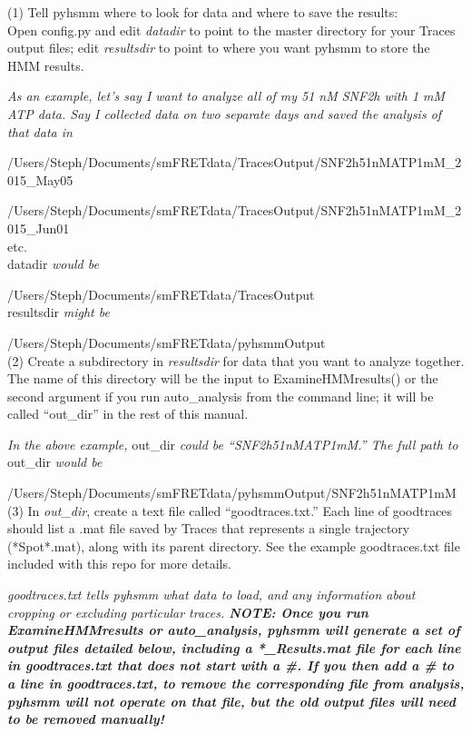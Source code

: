 \documentclass[11pt]{article}
\begin{document}
(1) Tell pyhsmm where to look for data and where to save the results:\\
Open config.py and edit {\it datadir} to point to the master directory for your Traces output files; edit {\it resultsdir} to point to where you want pyhsmm to store the HMM results.

{\it As an example, let's say I want to analyze all of my 51 nM SNF2h with 1 mM ATP data. Say I collected data on two separate days and saved the analysis of that data in}

/Users/Steph/Documents/smFRETdata/TracesOutput/SNF2h51nMATP1mM\_2015\_May05

/Users/Steph/Documents/smFRETdata/TracesOutput/SNF2h51nMATP1mM\_2015\_Jun01\\
 etc. \\
 datadir {\it would be }

/Users/Steph/Documents/smFRETdata/TracesOutput \\
\noindent resultsdir {\it might be}

/Users/Steph/Documents/smFRETdata/pyhsmmOutput\\

\noindent (2) Create a subdirectory in {\it resultsdir} for data that you want to analyze together. The name of this directory will be the input to ExamineHMMresults() or the second argument if you run auto\_analysis from the command line; it will be called ``out\_dir'' in the rest of this manual.

{\it In the above example,} out\_dir {\it could be ``SNF2h51nMATP1mM.'' The full path to} out\_dir {\it would be}

/Users/Steph/Documents/smFRETdata/pyhsmmOutput/SNF2h51nMATP1mM\\

\noindent (3) In {\it out\_dir}, create a text file called ``goodtraces.txt.'' Each line of goodtraces should list a .mat file saved by Traces that represents a single trajectory (*Spot*.mat), along with its parent directory. See the example goodtraces.txt file included with this repo for more details. 

{\it goodtraces.txt tells pyhsmm what data to load, and any information about cropping or excluding particular traces. {\bf NOTE: Once you run ExamineHMMresults or auto\_analysis, pyhsmm will generate a set of output files detailed below, including a *\_Results.mat file for each line in goodtraces.txt that does not start with a \#. If you then add a \# to a line in goodtraces.txt, to remove the corresponding file from analysis, pyhsmm will not operate on that file, but the old output files will need to be removed manually!}}\\
\end{document}
